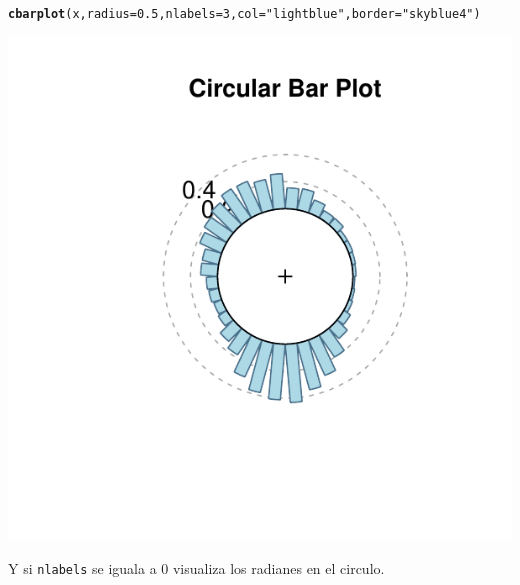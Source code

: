 \documentclass{article}\usepackage[]{graphicx}\usepackage[]{color}
\makeatletter
\def\maxwidth{ %
  \ifdim\Gin@nat@width>\linewidth
    \linewidth
  \else
    \Gin@nat@width
  \fi
}
\newcommand{\hlnum}[1]{\textcolor[rgb]{0.686,0.059,0.569}{#1}}%
\newcommand{\hlstr}[1]{\textcolor[rgb]{0.192,0.494,0.8}{#1}}%
\newcommand{\hlstd}[1]{\textcolor[rgb]{0.345,0.345,0.345}{#1}}%
\newcommand{\hlkwc}[1]{\textcolor[rgb]{0.333,0.667,0.333}{#1}}%
\newcommand{\hlkwd}[1]{\textcolor[rgb]{0.737,0.353,0.396}{\textbf{#1}}}%
\newenvironment{kframe}{%
 \def\at@end@of@kframe{}%
 \ifinner\ifhmode%
  \def\at@end@of@kframe{\end{minipage}}%
  \begin{minipage}{\columnwidth}%
 \fi\fi%
 \def\FrameCommand##1{\hskip\@totalleftmargin \hskip-\fboxsep
 \colorbox{shadecolor}{##1}\hskip-\fboxsep
     \hskip-\linewidth \hskip-\@totalleftmargin \hskip\columnwidth}%
 \MakeFramed {\advance\hsize-\width
   \@totalleftmargin\z@ \linewidth\hsize
   \@setminipage}}%
 {\par\unskip\endMakeFramed%
 \at@end@of@kframe}
\newenvironment{knitrout}{}{} %
\makeatother
\begin{document}
\begin{knitrout}
\color{fgcolor}\begin{kframe}
\begin{alltt}
\hlkwd{cbarplot}\hlstd{(x,} \hlkwc{radius}\hlstd{=}\hlnum{0.5}\hlstd{,} \hlkwc{nlabels}\hlstd{=}\hlnum{3}\hlstd{,} \hlkwc{col}\hlstd{=}\hlstr{"lightblue"}\hlstd{,} \hlkwc{border}\hlstd{=}\hlstr{"skyblue4"}\hlstd{)}
\end{alltt}
\end{kframe}

{\centering \includegraphics[width=\maxwidth]{figure/plot_cplots_cr-1} 

}



\end{knitrout}
\clearpage
Y si \texttt{nlabels} se iguala a 0 visualiza los radianes en el circulo.
\end{document}
